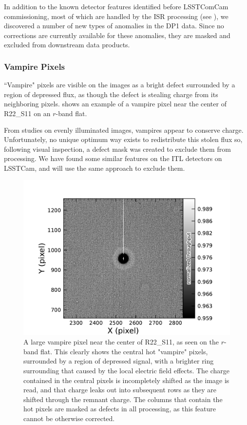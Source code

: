 In addition to the known detector features identified before LSSTComCam commissioning, most of which are handled by the ISR processing (see ), we discovered a number of new types of anomalies in the DP1 data. 
Since no corrections are currently available for these anomalies, they are masked and excluded from downstream data products.

\subsubsection{Vampire Pixels}
``Vampire" pixels are visible on the images as a bright defect surrounded by a region of depressed flux, as though the defect is stealing charge from its neighboring pixels.
 shows an example of a vampire pixel near the center of R22\_S11 on an $r$-band flat.

From studies on evenly illuminated images, vampires appear to conserve charge.
Unfortunately, no unique optimum way exists to redistribute this stolen flux so, following visual inspection, a defect mask was created to exclude them from processing.
We have found some similar features on the ITL detectors on LSSTCam, and will use the same approach to exclude them.
\begin{figure}[htb!]
  \centering
  \includegraphics[width=0.98\linewidth]{dp1_isr_anomalies-vampire_pixel}
  \caption{ A large vampire pixel near the center of R22\_S11, as seen on the $r$-band flat.  
  This clearly shows the central hot "vampire" pixels, surrounded by a region of depressed signal, with a brighter ring surrounding that caused by the local electric field effects.  
  The charge contained in the central pixels is incompletely shifted as the image is read, and that charge leaks out into subsequent rows as they are shifted through the remnant charge.  
  The columns that contain the hot pixels are masked as defects in all processing, as this feature cannot be otherwise corrected.}
   \label{fig:anomalies_vampire_pixels}
\end{figure}

